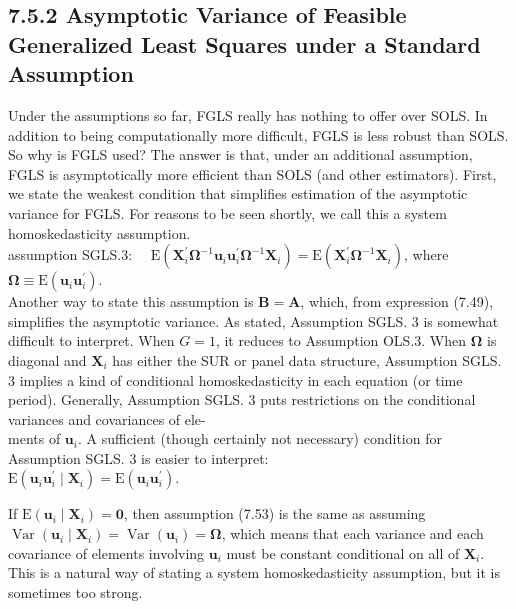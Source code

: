 \documentclass[10pt]{article}
\begin{document}
\subsection*{7.5.2 Asymptotic Variance of Feasible Generalized Least Squares under a Standard Assumption}
Under the assumptions so far, FGLS really has nothing to offer over SOLS. In addition to being computationally more difficult, FGLS is less robust than SOLS. So why is FGLS used? The answer is that, under an additional assumption, FGLS is asymptotically more efficient than SOLS (and other estimators). First, we state the weakest condition that simplifies estimation of the asymptotic variance for FGLS. For reasons to be seen shortly, we call this a system homoskedasticity assumption.\\
assumption SGLS.3: $\quad \mathrm{E}\left(\mathbf{X}_{i}^{\prime} \boldsymbol{\Omega}^{-1} \mathbf{u}_{i} \mathbf{u}_{i}^{\prime} \boldsymbol{\Omega}^{-1} \mathbf{X}_{i}\right)=\mathrm{E}\left(\mathbf{X}_{i}^{\prime} \boldsymbol{\Omega}^{-1} \mathbf{X}_{i}\right)$, where $\boldsymbol{\Omega} \equiv \mathrm{E}\left(\mathbf{u}_{i} \mathbf{u}_{i}^{\prime}\right)$.\\
Another way to state this assumption is $\mathbf{B}=\mathbf{A}$, which, from expression (7.49), simplifies the asymptotic variance. As stated, Assumption SGLS. 3 is somewhat difficult to interpret. When $G=1$, it reduces to Assumption OLS.3. When $\boldsymbol{\Omega}$ is diagonal and $\mathbf{X}_{i}$ has either the SUR or panel data structure, Assumption SGLS. 3 implies a kind of conditional homoskedasticity in each equation (or time period). Generally, Assumption SGLS. 3 puts restrictions on the conditional variances and covariances of ele-\\
ments of $\mathbf{u}_{i}$. A sufficient (though certainly not necessary) condition for Assumption SGLS. 3 is easier to interpret:\\
$\mathrm{E}\left(\mathbf{u}_{i} \mathbf{u}_{i}^{\prime} \mid \mathbf{X}_{i}\right)=\mathrm{E}\left(\mathbf{u}_{i} \mathbf{u}_{i}^{\prime}\right)$.

If $\mathrm{E}\left(\mathbf{u}_{i} \mid \mathbf{X}_{i}\right)=\mathbf{0}$, then assumption (7.53) is the same as assuming $\operatorname{Var}\left(\mathbf{u}_{i} \mid \mathbf{X}_{i}\right)= \operatorname{Var}\left(\mathbf{u}_{i}\right)=\boldsymbol{\Omega}$, which means that each variance and each covariance of elements involving $\mathbf{u}_{i}$ must be constant conditional on all of $\mathbf{X}_{i}$. This is a natural way of stating a system homoskedasticity assumption, but it is sometimes too strong.
\end{document}
